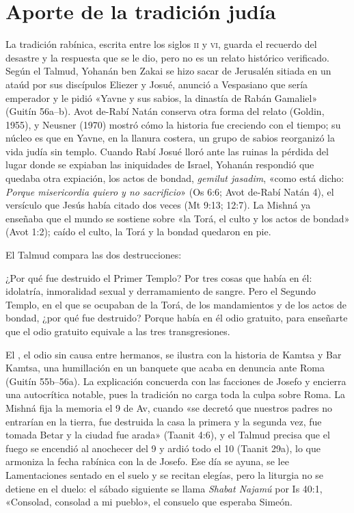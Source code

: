 \section{Aporte de la tradición judía}

La tradición rabínica, escrita entre los siglos \textsc{ii} y \textsc{vi}, guarda el recuerdo del desastre y la respuesta que se le dio, pero no es un relato histórico verificado. Según el Talmud, Yohanán ben Zakai se hizo sacar de Jerusalén sitiada en un ataúd por sus discípulos Eliezer y Josué, anunció a Vespasiano que sería emperador y le pidió «Yavne y sus sabios, la dinastía de Rabán Gamaliel» (Guitín 56a--b). Avot de-Rabí Natán conserva otra forma del relato (Goldin, 1955), y Neusner (1970) mostró cómo la historia fue creciendo con el tiempo; su núcleo es que en Yavne, en la llanura costera, un grupo de sabios reorganizó la vida judía sin templo. Cuando Rabí Josué lloró ante las ruinas la pérdida del lugar donde se expiaban las iniquidades de Israel, Yohanán respondió que quedaba otra expiación, los actos de bondad, \emph{gemilut jasadim}, «como está dicho: \emph{Porque misericordia quiero y no sacrificio}» (Os 6:6; Avot de-Rabí Natán 4), el versículo que Jesús había citado dos veces (Mt 9:13; 12:7). La Mishná ya enseñaba que el mundo se sostiene sobre «la Torá, el culto y los actos de bondad» (Avot 1:2); caído el culto, la Torá y la bondad quedaron en pie.

El Talmud compara las dos destrucciones:

\begin{cita}¿Por qué fue destruido el Primer Templo? Por tres cosas que había en él: idolatría, inmoralidad sexual y derramamiento de sangre. Pero el Segundo Templo, en el que se ocupaban de la Torá, de los mandamientos y de los actos de bondad, ¿por qué fue destruido? Porque había en él odio gratuito, para enseñarte que el odio gratuito equivale a las tres transgresiones.\end{cita}

El , el odio sin causa entre hermanos, se ilustra con la historia de Kamtsa y Bar Kamtsa, una humillación en un banquete que acaba en denuncia ante Roma (Guitín 55b--56a). La explicación concuerda con las facciones de Josefo y encierra una autocrítica notable, pues la tradición no carga toda la culpa sobre Roma. La Mishná fija la memoria el 9 de Av, cuando «se decretó que nuestros padres no entrarían en la tierra, fue destruida la casa la primera y la segunda vez, fue tomada Betar y la ciudad fue arada» (Taanit 4:6), y el Talmud precisa que el fuego se encendió al anochecer del 9 y ardió todo el 10 (Taanit 29a), lo que armoniza la fecha rabínica con la de Josefo. Ese día se ayuna, se lee Lamentaciones sentado en el suelo y se recitan elegías, pero la liturgia no se detiene en el duelo: el sábado siguiente se llama \emph{Shabat Najamú} por Is 40:1, «Consolad, consolad a mi pueblo», el consuelo que esperaba Simeón.

